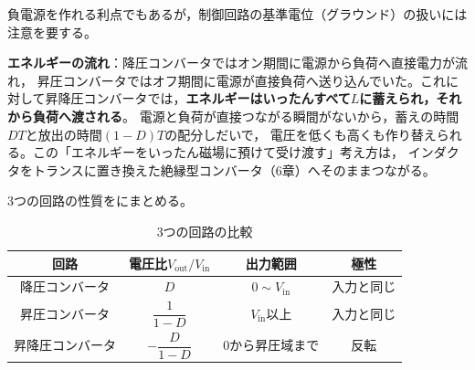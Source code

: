 \begin{注意}
負電源を作れる利点でもあるが，制御回路の基準電位（グラウンド）の扱いには注意を要する。
\end{注意}

\textbf{エネルギーの流れ}：降圧コンバータではオン期間に電源から負荷へ直接電力が流れ，
昇圧コンバータではオフ期間に電源が直接負荷へ送り込んでいた。これに対して昇降圧コンバータでは，\textbf{エネルギーはいったんすべて$L$に蓄えられ，それから負荷へ渡される}。
電源と負荷が直接つながる瞬間がないから，蓄えの時間$DT$と放出の時間$(1-D)T$の配分しだいで，
電圧を低くも高くも作り替えられる。この「エネルギーをいったん磁場に預けて受け渡す」考え方は，
インダクタをトランスに置き換えた絶縁型コンバータ（6章）へそのままつながる。

3つの回路の性質をにまとめる。

\begin{table}[ht]
\begin{center}
\caption{3つの回路の比較}
\label{tab5.1}
\renewcommand{\arraystretch}{1.9}
\begin{tabular}{c|c|c|c}
\hline
回路 & 電圧比$V_{\mathrm{out}}/V_{\mathrm{in}}$ & 出力範囲 & 極性 \\
\hline
降圧コンバータ & $D$ & $0 \sim V_{\mathrm{in}}$ & 入力と同じ \\
昇圧コンバータ & $\dfrac{1}{1-D}$ & $V_{\mathrm{in}}$以上 & 入力と同じ \\
昇降圧コンバータ & $-\dfrac{D}{1-D}$ & 0から昇圧域まで & 反転 \\
\hline
\end{tabular}
\end{center}
\end{table}



